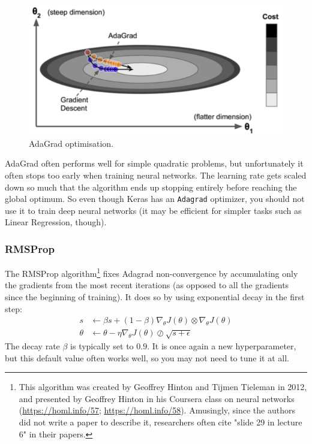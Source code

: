 \documentclass[12pt, letterpaper]{article}
\theoremstyle{definition}
\let\cd\lstinline
\begin{document}
\begin{figure}
\centering
\includegraphics[scale=0.5]{img/adagrad}
\caption{AdaGrad optimisation.}
\label{fig:adagrad}
\end{figure}
AdaGrad often performs well for simple quadratic problems, but unfortunately it often stops too early when training neural networks. The learning rate gets scaled down so much that the algorithm ends up stopping entirely before reaching the global optimum. So even though Keras has an \cd+Adagrad+ optimizer, you should not use it to train deep neural networks (it may be efficient for simpler tasks such as Linear Regression, though). 

\subsubsection{RMSProp}
The RMSProp algorithm\footnote{This algorithm was created by Geoffrey Hinton and Tijmen Tieleman in 2012, and presented by Geoffrey Hinton in his Coursera class on neural networks (\href{slides}{https://homl.info/57}; \href{video}{https://homl.info/58}). Amusingly, since the authors did not write a paper to describe it, researchers often cite "slide 29 in lecture 6" in their papers.} fixes Adagrad non-convergence by accumulating only the gradients from the most recent iterations (as opposed to all the gradients since the beginning of training). It does so by using exponential decay in the first step:
\begin{equation}
\begin{aligned}
s &\leftarrow \beta s + (1-\beta) \nabla_\theta J(\theta) \otimes \nabla_\theta J(\theta)\\
\theta &\leftarrow \theta - \eta \nabla_\theta J(\theta) \oslash \sqrt{s+\epsilon}
\end{aligned}
\end{equation}
The decay rate $\beta$ is typically set to $0.9$. It is once again a new hyperparameter, but this default value often works well, so you may not need to tune it at all.
\end{document}
